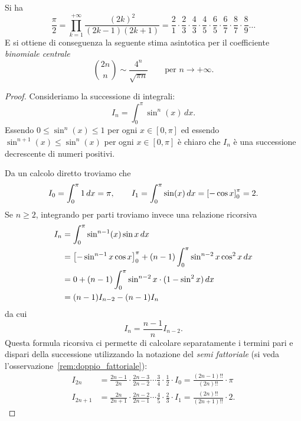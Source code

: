 \begin{theorem}
\label{th:wallis}%
\mymark{*}%
%
%
%
%
Si ha
\[
  \frac{\pi}{2}
  = \prod_{k=1}^{+\infty} \frac{(2k)^2}{(2k-1)(2k+1)}
  = \frac{2}{1}
  \cdot \frac{2}{3}
  \cdot \frac{4}{3}
  \cdot \frac{4}{5}
  \cdot \frac{6}{5}
  \cdot \frac{6}{7}
  \cdot \frac{8}{7}
  \cdot \frac{8}{9}
  \dots
\]
E si ottiene di conseguenza la seguente stima asintotica per
il coefficiente \emph{binomiale centrale}%
%
\[
 {2n \choose n} \sim \frac{4^n}{\sqrt{\pi n}}
 \qquad \text{per $n\to +\infty$.}
\]
\end{theorem}
%
\begin{proof}
Consideriamo la successione di integrali:
\[
  I_n = \int_0^\pi \sin^n(x)\, dx.
\]
Essendo $0\le \sin^n(x) \le 1$ per ogni $x\in [0,\pi]$ ed essendo
$\sin^{n+1}(x)\le \sin^n(x)$ per ogni $x\in[0,\pi]$ è chiaro che $I_n$ è una
successione decrescente di numeri positivi.

Da un calcolo diretto troviamo che
\[
  I_0 = \int_0^\pi 1\, dx = \pi, \qquad
  I_1 = \int_0^\pi \sin(x)\, dx = {\left[ -\cos x \right]}_0^\pi = 2.
\]
Se $n\ge 2$,
integrando per parti troviamo invece una relazione ricorsiva
\begin{align*}
 I_n &= \int_0^\pi \sin^{n-1}(x) \sin x\, dx \\
     &= {\left[ -\sin^{n-1} x \cos x  \right]}_0^\pi + (n-1)\int_0^\pi \sin^{n-2} x \cos^2 x \, dx \\
     &= 0 + (n-1)\int_0^\pi\sin^{n-2}x\cdot (1-\sin^2 x)\, dx \\
     &= (n-1) I_{n-2} - (n-1) I_{n}
\end{align*}
da cui
\begin{equation}
\label{eq:187464}%
  I_n = \frac{n-1}{n} I_{n-2}.
\end{equation}
Questa formula ricorsiva ci permette di calcolare separatamente
i termini pari e dispari della successione
utilizzando la notazione del \emph{semi fattoriale}
(si veda l'osservazione~\ref{rem:doppio_fattoriale}):
\begin{align*}
  I_{2n}
  &= \frac{2n-1}{2n}\cdot \frac{2n-3}{2n-2} \cdots \frac {3}{4}\cdot \frac{1}{2} \cdot I_0
  = \frac{(2n-1)!!}{(2n)!!} \cdot \pi \\
  I_{2n+1} &= \frac{2n}{2n+1}\cdot \frac {2n-2}{2n-1} \cdots
  \frac{4}{5}\cdot \frac{2}{3} \cdot I_1
  = \frac{(2n)!!}{(2n+1)!!}\cdot 2.
\end{align*}


\end{proof}
